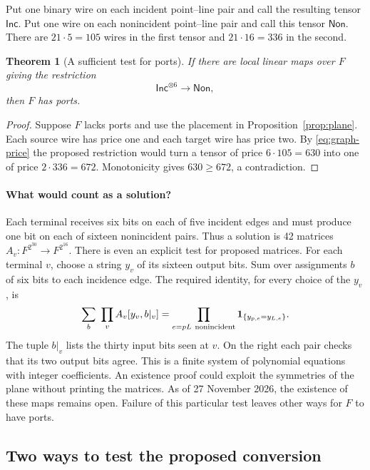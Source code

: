 \documentclass[11pt]{article}
\newtheorem{theorem}{Theorem}[section]
\theoremstyle{definition}
\newcommand{\one}{\mathbf 1}
\newcommand{\res}{\longrightarrow}
\newcommand{\src}{\mathsf{Inc}}
\newcommand{\tgt}{\mathsf{Non}}
\newcommand{\fieldstatus}{27 November 2026}
\begin{document}
Put one binary wire on each incident point--line pair and call the
resulting tensor \(\src\). Put one wire on each nonincident point--line
pair and call this tensor \(\tgt\). There are \(21\cdot5=105\) wires in
the first tensor and \(21\cdot16=336\) in the second.

\begin{theorem}[A sufficient test for ports]\label{thm:six}
If there are local linear maps over \(F\) giving the restriction
\[
                            \src^{\otimes6}\res\tgt ,
\]
then \(F\) has ports.
\end{theorem}
\begin{proof}
Suppose \(F\) lacks ports and use the placement in
Proposition~\ref{prop:plane}. Each source wire has price one and each
target wire has price two. By \eqref{eq:graph-price} the proposed
restriction would turn a tensor of price \(6\cdot105=630\) into one of
price \(2\cdot336=672\). Monotonicity gives \(630\ge672\), a
contradiction.
\end{proof}

\paragraph{What would count as a solution?}
Each terminal receives six bits on each of five incident edges and must
produce one bit on each of sixteen nonincident pairs. Thus a solution is
42 matrices \(A_v:F^{2^{30}}\to F^{2^{16}}\). There is even an explicit
test for proposed matrices. For each terminal \(v\), choose a string \(y_v\)
of its sixteen output bits. Sum over assignments \(b\) of six bits to each
incidence edge. The required identity, for every choice of the \(y_v\), is
\begin{equation}
  \sum_b\ \prod_v A_v[y_v,b|_v]
  =\prod_{e=pL\ {\rm nonincident}}\one_{\{y_{p,e}=y_{L,e}\}} .
  \label{eq:witness}
\end{equation}
The tuple \(b|_v\) lists the thirty input bits seen at \(v\). On the right
each pair checks that its two output bits agree. This is a finite system
of polynomial equations with integer coefficients. An existence proof
could exploit the symmetries of the plane without printing the matrices.
As of \fieldstatus{}, the existence of these maps remains open. Failure
of this particular test leaves other ways for \(F\) to have ports.

\subsection{Two ways to test the proposed conversion}
\label{sec:cuts}
\end{document}
